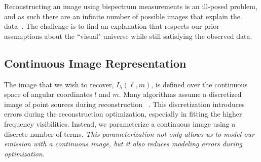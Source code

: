 Reconstructing an image using bispectrum measurements is an ill-posed problem, and as such there are an infinite number of possible images that explain the data~\cite{rusenimaging}. 
The challenge is to find an explanation that respects our prior assumptions about the ``visual" universe
while still satisfying the observed data. 





\subsection{Continuous Image Representation}


The image that we wish to recover, $I_{\lambda}(\ell,m)$, is defined over the continuous space of angular coordinates $l$ and $m$. 
Many algorithms assume a discretized image of point sources during reconstruction 
~\cite{taylor1999synthesis}. This discretization introduces errors during the reconstruction optimization, especially in fitting the higher frequency visibilities.
Instead, we parameterize a continuous image using a discrete number of terms. 
{\it This parameterization not only allows us to model our emission with a continuous image, but it also reduces modeling errors during optimization. }

